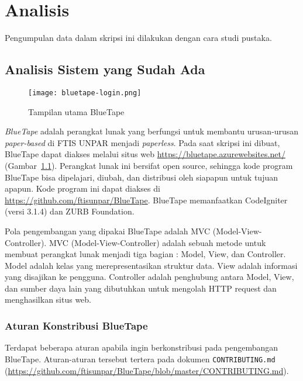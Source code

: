 
\chapter{Analisis}
\label{chap:analisis}
	Pengumpulan data dalam skripsi ini dilakukan dengan cara studi pustaka.

\section{Analisis Sistem yang Sudah Ada}
\label{sec:analisiskini}
\begin{figure}[H]
	\centering  
	\texttt{[image: bluetape-login.png]}  
	\caption[Tampilan utama BlueTape]{Tampilan utama BlueTape} 
	\label{fig:bluetape-login} 
\end{figure}

	\textit{BlueTape} adalah perangkat lunak yang berfungsi untuk membantu urusan-urusan \textit{paper-based} di FTIS UNPAR menjadi \textit{paperless}. Pada saat skripsi ini dibuat, BlueTape dapat diakses melalui situs web \url{https://bluetape.azurewebsites.net/} (Gambar~\ref{fig:bluetape-login}). Perangkat lunak ini bersifat open source, sehingga kode program BlueTape bisa dipelajari, diubah, dan distribusi oleh siapapun untuk tujuan apapun. Kode program ini dapat diakses di \url{https://github.com/ftisunpar/BlueTape}. BlueTape memanfaatkan CodeIgniter (versi 3.1.4) dan ZURB Foundation.
	
	Pola pengembangan yang dipakai BlueTape adalah MVC (Model-View-Controller). MVC (Model-View-Controller) adalah sebuah metode untuk membuat perangkat lunak menjadi tiga bagian : Model, View, dan Controller. Model adalah kelas yang merepresentasikan struktur data. View adalah informasi yang disajikan ke pengguna. Controller adalah penghubung antara Model, View, dan sumber daya lain yang dibutuhkan untuk mengolah HTTP request dan menghasilkan situs web.

\subsection{Aturan Konstribusi BlueTape}
	Terdapat beberapa aturan apabila ingin berkonstribusi pada pengembangan BlueTape. Aturan-aturan tersebut tertera pada dokumen \texttt{CONTRIBUTING.md} (\url{https://github.com/ftisunpar/BlueTape/blob/master/CONTRIBUTING.md}).

